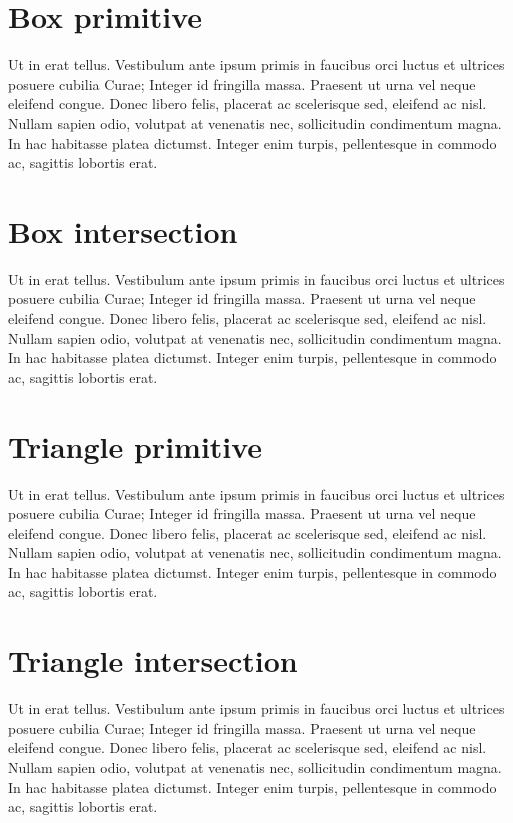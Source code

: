 \section{Box primitive}
Ut in erat tellus. Vestibulum ante ipsum primis in faucibus orci luctus et ultrices posuere cubilia Curae; Integer id fringilla massa. Praesent ut urna vel neque eleifend congue. Donec libero felis, placerat ac scelerisque sed, eleifend ac nisl. Nullam sapien odio, volutpat at venenatis nec, sollicitudin condimentum magna. In hac habitasse platea dictumst. Integer enim turpis, pellentesque in commodo ac, sagittis lobortis erat.
\section{Box intersection}
Ut in erat tellus. Vestibulum ante ipsum primis in faucibus orci luctus et ultrices posuere cubilia Curae; Integer id fringilla massa. Praesent ut urna vel neque eleifend congue. Donec libero felis, placerat ac scelerisque sed, eleifend ac nisl. Nullam sapien odio, volutpat at venenatis nec, sollicitudin condimentum magna. In hac habitasse platea dictumst. Integer enim turpis, pellentesque in commodo ac, sagittis lobortis erat.
\section{Triangle primitive}
Ut in erat tellus. Vestibulum ante ipsum primis in faucibus orci luctus et ultrices posuere cubilia Curae; Integer id fringilla massa. Praesent ut urna vel neque eleifend congue. Donec libero felis, placerat ac scelerisque sed, eleifend ac nisl. Nullam sapien odio, volutpat at venenatis nec, sollicitudin condimentum magna. In hac habitasse platea dictumst. Integer enim turpis, pellentesque in commodo ac, sagittis lobortis erat.
\section{Triangle intersection}
Ut in erat tellus. Vestibulum ante ipsum primis in faucibus orci luctus et ultrices posuere cubilia Curae; Integer id fringilla massa. Praesent ut urna vel neque eleifend congue. Donec libero felis, placerat ac scelerisque sed, eleifend ac nisl. Nullam sapien odio, volutpat at venenatis nec, sollicitudin condimentum magna. In hac habitasse platea dictumst. Integer enim turpis, pellentesque in commodo ac, sagittis lobortis erat.
